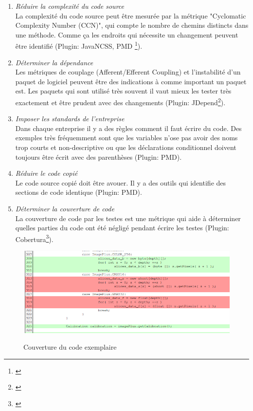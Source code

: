 \begin{enumerate}

\item \textit{Réduire la complexité du code source} \\ La complexité du code source peut être mesurée par la métrique "Cyclomatic Complexity Number (CCN)", qui compte le nombre de chemins distincts dans une méthode. Comme ça les endroits qui nécessite un changement peuvent être identifié (Plugin: JavaNCSS, PMD \footnote{\citep{pluginpmd}}).

\item \textit{Déterminer la dépendance} \\ Les métriques de couplage (Afferent/Efferent Coupling) et l'instabilité d'un paquet de logiciel peuvent être des indications à comme important un paquet est. Les paquets qui sont utilisé très souvent il vaut mieux les tester très exactement et être prudent avec des changements (Plugin: JDepend\footnote{\citep{pluginjdepend}}).

\item \textit{Imposer les standards de l'entreprise}\\ Dans chaque entreprise il y a des règles comment il faut écrire du code. Des exemples très fréquemment sont que les variables n'ose pas avoir des noms trop courts et non-descriptive ou que les déclarations conditionnel doivent toujours être écrit avec des parenthèses (Plugin: PMD).

\item \textit{Réduire le code copié} \\ Le code source copié doit être avouer. Il y a des outils qui identifie des sections de code identique (Plugin: PMD).

\item \textit{Déterminer la couverture de code} \\ La couverture de code par les testes est une métrique qui aide à déterminer quelles parties du code ont été négligé pendant écrire les testes (Plugin: Cobertura\footnote{\citep{plugincobertura}}).

\end{enumerate}

\begin{figure}[H]
\centering
\includegraphics[width=15cm]{bilder/Coverage}
\caption{Couverture du code exemplaire} \cite{codecoverage}
\label{fig:coverage}
\end{figure}


